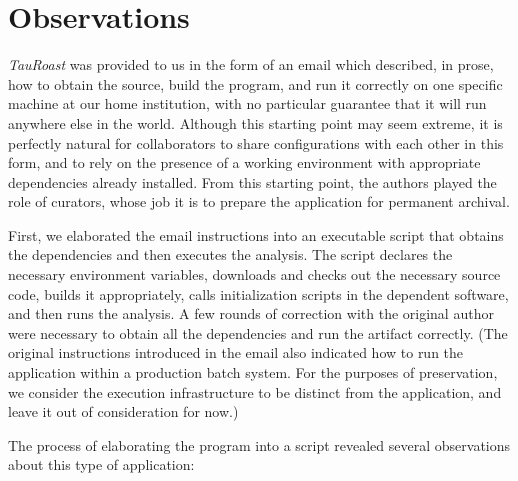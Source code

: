 \documentclass[procedia]{easychair}
\begin{document}
\section{Observations}

\emph{TauRoast} was provided to us in the form of an
email which described, in prose, how to obtain the source,
build the program, and run it correctly on one specific
machine at our home institution, with no particular guarantee that
it will run anywhere else in the world.
Although this starting point may seem extreme, it is
perfectly natural for collaborators to share configurations
with each other in this form, and to rely on the presence
of a working environment with appropriate dependencies already
installed.  From this starting point, the authors played the
role of curators, whose job it is to prepare the application
for permanent archival.

First, we elaborated the email instructions into an
executable script that obtains the dependencies and then
executes the analysis.  The script declares the necessary
environment variables, downloads and checks out the necessary source code,
builds it appropriately, calls initialization scripts in
the dependent software, and then runs the analysis.
A few rounds of correction with the original author were necessary
to obtain all the dependencies and run the artifact correctly.
(The original instructions introduced in the email also indicated how to run the application
within a production batch system.  For the purposes of preservation,
we consider the execution infrastructure to be distinct from the application,
and leave it out of consideration for now.)

The process of elaborating the program into a script revealed
several observations about this type of application:
\end{document}
